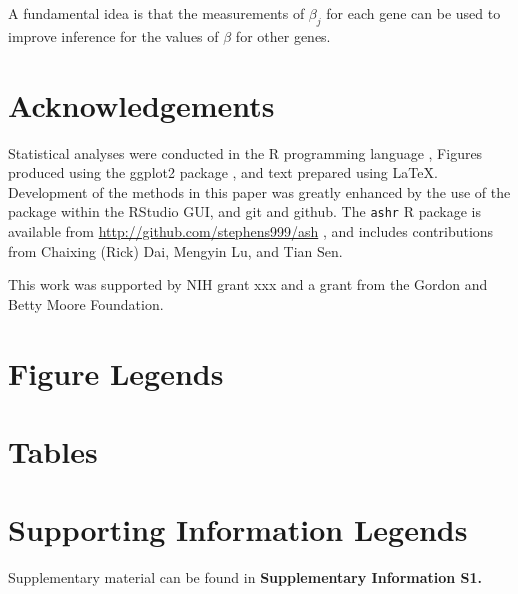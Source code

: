 \documentclass[11pt]{article}
\begin{document}
A fundamental idea is
that the measurements of $\beta_j$ for each gene can be used to improve inference for the values of $\beta$ for other genes.


\section*{Acknowledgements}

Statistical analyses were conducted in the {\sf R} programming language \cite{Rcore:2012}, Figures produced using the ggplot2 package \cite{ggplot2}, and text
prepared using \LaTeX. Development of the methods in this paper was greatly enhanced by the use of the \cite{knitr} package within the RStudio GUI, and 
git and github. The {\tt ashr} R package is available from \url{http://github.com/stephens999/ash} , and includes contributions 
from Chaixing (Rick) Dai, Mengyin Lu, and Tian Sen. 

This work was supported by NIH grant xxx and a grant from the Gordon and Betty Moore Foundation.




\section*{Figure Legends}


\clearpage

\section*{Tables}

\section*{Supporting Information Legends}

Supplementary material can be found in {\bf Supplementary Information S1.}
\end{document}
